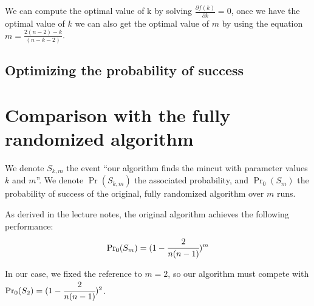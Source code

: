 We can compute the optimal value of k by solving $\frac{\partial f(k)}{\partial k} = 0$, once we have the optimal value of $k$ we can also get the optimal value of $m$ by using the equation $m = \frac{2(n-2)-k}{(n-k-2)}$. 



  \subsection{Optimizing the probability of success}


\section{Comparison with the fully randomized algorithm}
  We denote $S_{k, m}$ the event ``our algorithm finds the mincut with parameter values $k$ and $m$''. We denote $\Pr(S_{k, m})$ the associated probability, and $\Pr_0(S_m)$ the probability of success of the original, fully randomized algorithm over $m$ runs.

  \noindent
  As derived in the lecture notes, the original algorithm achieves the following performance:
  \[
    {\Pr}_0(S_m) = (1 - \cfrac{2}{n(n-1)})^m
  \]

  \noindent
  In our case, we fixed the reference to $m = 2$, so our algorithm must compete with $\Pr_0(S_2) = (1 - \cfrac{2}{n(n-1)})^2$.

